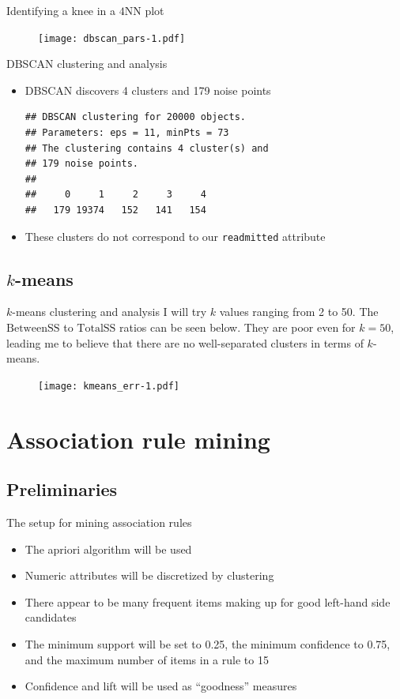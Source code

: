 \documentclass[serif, hyperref={unicode}, xcolor={x11names, psnames, dvipsnames,
  table}, usepdftitle=false]{beamer}
\begin{document}
\begin{frame}{Identifying a knee in a $4$NN plot}
  \begin{figure}[!h]
    \texttt{[image: dbscan\_pars-1.pdf]}
  \end{figure}
\end{frame}

\begin{frame}[fragile]{DBSCAN clustering and analysis}
  \begin{itemize}
  \item DBSCAN discovers \num{4} clusters and \num{179} noise points
\begin{Verbatim}
## DBSCAN clustering for 20000 objects.
## Parameters: eps = 11, minPts = 73
## The clustering contains 4 cluster(s) and
## 179 noise points.
## 
##     0     1     2     3     4 
##   179 19374   152   141   154 
\end{Verbatim}
  \item  These clusters do not correspond to our \texttt{readmitted} attribute
  \end{itemize}
\end{frame}

\subsection{$k$-means}
\begin{frame}{$k$-means clustering and analysis}
  I will try $k$ values ranging from \num{2} to \num{50}.  The
  $\mathrm{BetweenSS}$ to $\mathrm{TotalSS}$ ratios can be seen below.  They are
  poor even for $k = 50$, leading me to believe that there are no well-separated
  clusters in terms of $k$-means.

  \begin{figure}[!h]
    \texttt{[image: kmeans\_err-1.pdf]}
  \end{figure}
\end{frame}

\section{Association rule mining}

\subsection{Preliminaries}
\begin{frame}{The setup for mining association rules}
  \begin{itemize}
  \item The apriori algorithm will be used
  \item Numeric attributes will be discretized by clustering
  \item There appear to be many frequent items making up for good left-hand side
    candidates
  \item The minimum support will be set to \num{0.25}, the minimum confidence to
    \num{0.75}, and the maximum number of items in a rule to \num{15}
  \item Confidence and lift will be used as ``goodness'' measures
  \end{itemize}
\end{frame}
\end{document}
